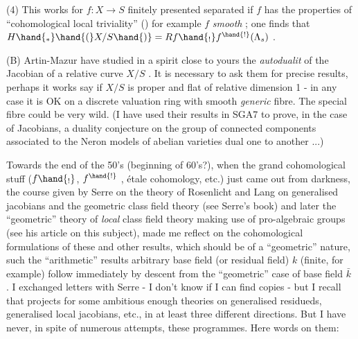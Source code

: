 
(4) This works  for $f : X \to S$ finitely presented separated if $f$ has the
 properties of ``cohomological local triviality''  () for
example $f$ \textit{smooth} ; one finds that $H\hand{_*}\hand{(}X/S\hand{)} = Rf\hand{_!}f^{\hand{!}}(\Lambda_s)$ . 

(B) Artin-Mazur have studied in a spirit close to yours the \textit{autodualit} of
the Jacobian of a relative curve $X/S$ . It is necessary to ask them for
precise results, perhaps it works say if $X/S$ is proper and flat of relative
dimension 1 - in any case it is OK on a discrete valuation ring with smooth
\textit{generic} fibre. The special fibre could be very wild. (I have used their
results in SGA7 to prove, in the case of Jacobians, a duality conjecture on
the group of connected components associated to the Neron models of abelian
varieties dual one to another ...)

Towards the end  of the 50's (beginning of 60's?), when the
grand cohomological stuff ($f\hand{_!}$, $f^{\hand{!}}$ , étale cohomology, etc.)\deleted{,} just came out
from darkness, the course given by Serre on the theory of Rosenlicht and Lang
on generalised jacobians and the geometric class field theory (see Serre's book)
and later the ``geometric'' theory of \textit{local} class field theory making use of
pro-algebraic groups (see his article on this subject), made me reflect on
the cohomological formulations of these and other results, which should be
of a ``geometric'' nature, such   the ``arithmetic'' results   arbitrary
base field (or residual field) $k$ (finite, for example) follow immediately
by descent from the ``geometric'' case of base field $\bar{k}$ . I exchanged letters
with Serre - I don't know if I can find copies - but I recall that  
projects for some ambitious enough theories on generalised residueds,
generalised local jacobians, etc., in at least three different directions.
 But I have never, in spite of numerous attempts,  
  these programmes. Here   words on them:

